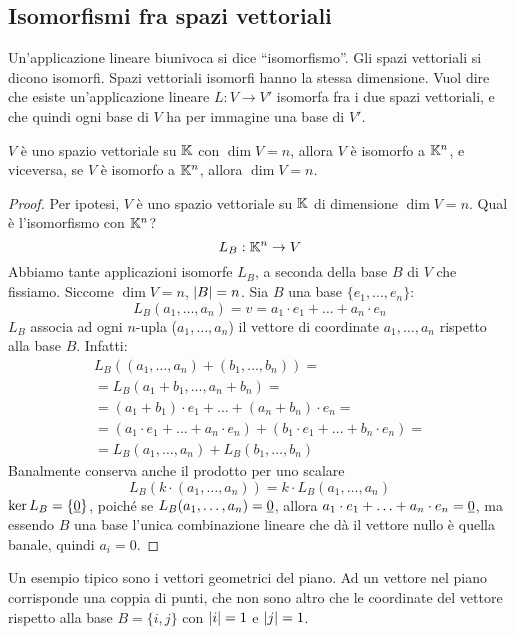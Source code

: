 \subsection{Isomorfismi fra spazi vettoriali}
Un'applicazione lineare biunivoca si dice ``isomorfismo''. Gli spazi vettoriali si dicono isomorfi. Spazi vettoriali isomorfi hanno la stessa dimensione. Vuol dire che esiste un'applicazione lineare $L : V \to V'$ isomorfa fra i due spazi vettoriali, e che quindi ogni base di $V$ ha per immagine una base di $V'$.
\begin{theorem}
$V$ \`e uno spazio vettoriale su $\mathbb{K}$ con $\dim V = n$, allora $V$ \`e isomorfo a $\mathbb{K}^n$, e viceversa, se $V$ \`e isomorfo a $\mathbb{K}^n$, allora $\dim V = n$.
\end{theorem}
\begin{proof}
Per ipotesi, $V$ \`e uno spazio vettoriale su $\mathbb{K}$ di dimensione $\dim V = n$. Qual \`e l'isomorfismo con $\mathbb{K}^n$?
\[
L_B : \mathbb{K}^n \to V 
\]
Abbiamo tante applicazioni isomorfe $L_B$, a seconda della base $B$ di $V$ che fissiamo. Siccome $\dim V = n$, $\left\lvert{B}\right\rvert = n$. Sia $B$ una base $\{ e_1, \ldots, e_n \}$:
\[
L_B (a_1, \ldots, a_n) = v = a_1 \cdot e_1 + \dots + a_n \cdot e_n
\]
$L_B$ associa ad ogni $n$-upla ($a_{1}, \ldots, a_{n}$) il vettore di coordinate $a_{1}, \ldots, a_{n}$ rispetto alla base $B$. Infatti:
\begin{align*}
L_B \left( (a_{1}, \ldots, a_{n}) + (b_{1}, \ldots, b_{n}) \right) = \\
= L_B \left( a_1 + b_1, \ldots,  a_n + b_n \right) = \\
= (a_1 + b_1) \cdot e_1 + \ldots + (a_n + b_n) \cdot e_n = \\
= (a_1 \cdot e_1 + \ldots + a_n \cdot e_n) + (b_1 \cdot e_1 + \ldots + b_n \cdot e_n) = \\
= L_B (a_{1}, \ldots, a_{n}) + L_B(b_{1}, \ldots, b_{n})
\end{align*}
Banalmente conserva anche il prodotto per uno scalare
\[
L_B(k \cdot (a_{1}, \ldots, a_{n})) = k \cdot L_B(a_{1}, \ldots, a_{n})
\]
$\ker L_B = \{ \underline{0} \}$, poich\'e se $L_B(a_{1}, \ldots, a_{n}) = \underline{0}$, allora $a_1 \cdot e_1 + \ldots + a_n \cdot e_n = \underline{0}$, ma essendo $B$ una base l'unica combinazione lineare che d\`a il vettore nullo \`e quella banale, quindi $a_i = 0$.
\end{proof}

Un esempio tipico sono i vettori geometrici del piano. Ad un vettore nel piano corrisponde una coppia di punti, che non sono altro che le coordinate del vettore rispetto alla base $B = \{ i, j \}$ con $\left\lvert{i}\right\rvert = 1$ e $\left\lvert{j}\right\rvert = 1$.

